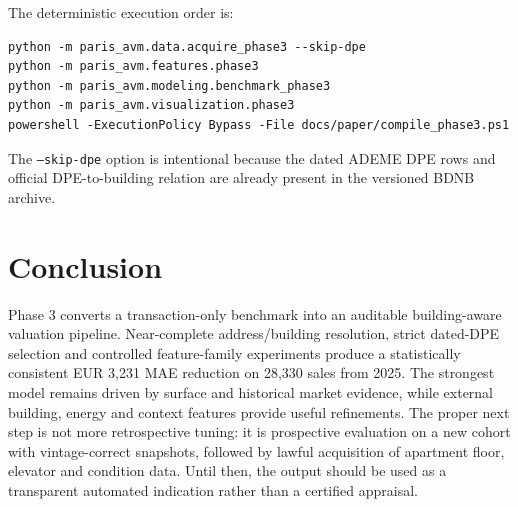 \documentclass[11pt,a4paper]{article}
\begin{document}
The deterministic execution order is:
\begin{verbatim}
python -m paris_avm.data.acquire_phase3 --skip-dpe
python -m paris_avm.features.phase3
python -m paris_avm.modeling.benchmark_phase3
python -m paris_avm.visualization.phase3
powershell -ExecutionPolicy Bypass -File docs/paper/compile_phase3.ps1
\end{verbatim}
The \texttt{--skip-dpe} option is intentional because the dated ADEME DPE rows
and official DPE-to-building relation are already present in the versioned BDNB
archive.

\section{Conclusion}

Phase 3 converts a transaction-only benchmark into an auditable building-aware
valuation pipeline. Near-complete address/building resolution, strict dated-DPE
selection and controlled feature-family experiments produce a statistically
consistent EUR 3,231 MAE reduction on 28,330 sales from 2025. The strongest
model remains driven by surface and historical market evidence, while external
building, energy and context features provide useful refinements. The proper
next step is not more retrospective tuning: it is prospective evaluation on a
new cohort with vintage-correct snapshots, followed by lawful acquisition of
apartment floor, elevator and condition data. Until then, the output should be
used as a transparent automated indication rather than a certified appraisal.
\end{document}
